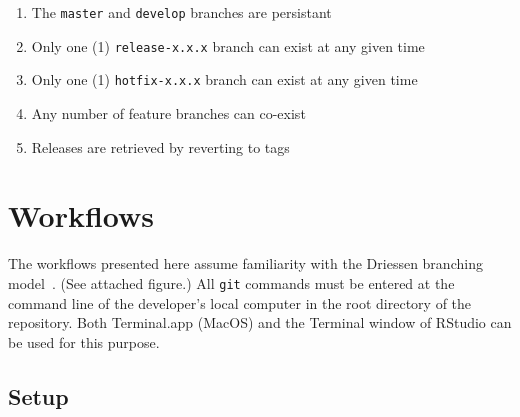\documentclass{article}
\begin{document}
\begin{enumerate}

  \item The \texttt{master} and \texttt{develop} branches are persistant
  
  \item Only one (1) \texttt{release-x.x.x} branch can exist at any given time

  \item Only one (1) \texttt{hotfix-x.x.x} branch can exist at any given time
  
  \item Any number of feature branches can co-exist
  
  \item Releases are retrieved by reverting to tags

\end{enumerate}


\section{Workflows} 
\label{sec:workflows}

The workflows presented here assume familiarity 
with the Driessen branching model~\cite{Driessen:2010}. 
(See attached figure.)
All \texttt{git} commands must be entered 
at the command line of the developer's local computer
in the root directory of the repository.
Both Terminal.app (MacOS) and the Terminal window of RStudio
can be used for this purpose.


\subsection{Setup} 
\label{sec:setup}
\end{document}

